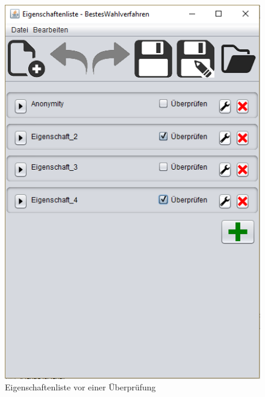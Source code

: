 \documentclass[a4paper]{scrreprt}
\begin{document}
\begin{figure}[H]
\begin{minipage}{.5\textwidth}
  \centering
  \includegraphics[scale=0.5]{Eigenschaften-Liste.png}
  \caption{Eigenschaftenliste vor einer Überprüfung}
  \label{Eigenschaften-Liste-vor}
\end{minipage}
\begin{minipage}{.5\textwidth}
  \centering

\end{minipage}
\end{figure}
\end{document}
